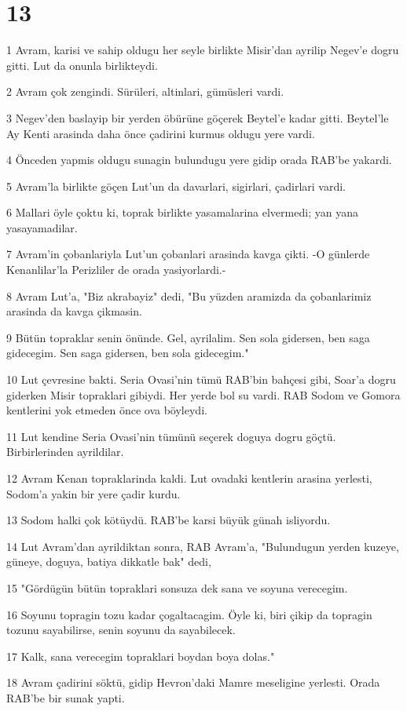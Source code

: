 \chapter{13}

\par 1 Avram, karisi ve sahip oldugu her seyle birlikte Misir'dan ayrilip Negev'e dogru gitti. Lut da onunla birlikteydi.
\par 2 Avram çok zengindi. Sürüleri, altinlari, gümüsleri vardi.
\par 3 Negev'den baslayip bir yerden öbürüne göçerek Beytel'e kadar gitti. Beytel'le Ay Kenti arasinda daha önce çadirini kurmus oldugu yere vardi.
\par 4 Önceden yapmis oldugu sunagin bulundugu yere gidip orada RAB'be yakardi.
\par 5 Avram'la birlikte göçen Lut'un da davarlari, sigirlari, çadirlari vardi.
\par 6 Mallari öyle çoktu ki, toprak birlikte yasamalarina elvermedi; yan yana yasayamadilar.
\par 7 Avram'in çobanlariyla Lut'un çobanlari arasinda kavga çikti. -O günlerde Kenanlilar'la Perizliler de orada yasiyorlardi.-
\par 8 Avram Lut'a, "Biz akrabayiz" dedi, "Bu yüzden aramizda da çobanlarimiz arasinda da kavga çikmasin.
\par 9 Bütün topraklar senin önünde. Gel, ayrilalim. Sen sola gidersen, ben saga gidecegim. Sen saga gidersen, ben sola gidecegim."
\par 10 Lut çevresine bakti. Seria Ovasi'nin tümü RAB'bin bahçesi gibi, Soar'a dogru giderken Misir topraklari gibiydi. Her yerde bol su vardi. RAB Sodom ve Gomora kentlerini yok etmeden önce ova böyleydi.
\par 11 Lut kendine Seria Ovasi'nin tümünü seçerek doguya dogru göçtü. Birbirlerinden ayrildilar.
\par 12 Avram Kenan topraklarinda kaldi. Lut ovadaki kentlerin arasina yerlesti, Sodom'a yakin bir yere çadir kurdu.
\par 13 Sodom halki çok kötüydü. RAB'be karsi büyük günah isliyordu.
\par 14 Lut Avram'dan ayrildiktan sonra, RAB Avram'a, "Bulundugun yerden kuzeye, güneye, doguya, batiya dikkatle bak" dedi,
\par 15 "Gördügün bütün topraklari sonsuza dek sana ve soyuna verecegim.
\par 16 Soyunu topragin tozu kadar çogaltacagim. Öyle ki, biri çikip da topragin tozunu sayabilirse, senin soyunu da sayabilecek.
\par 17 Kalk, sana verecegim topraklari boydan boya dolas."
\par 18 Avram çadirini söktü, gidip Hevron'daki Mamre meseligine yerlesti. Orada RAB'be bir sunak yapti.

